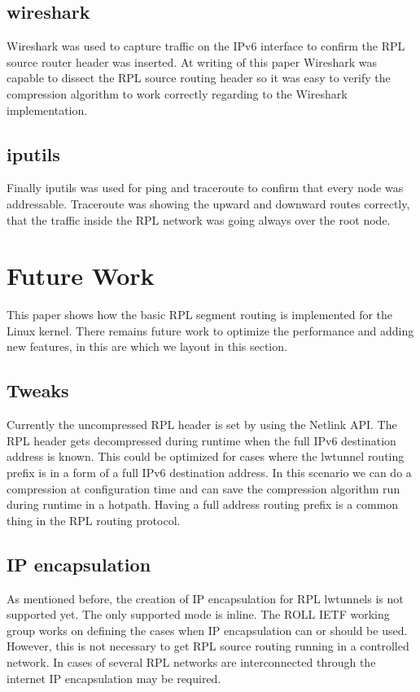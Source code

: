 \documentclass[letterpaper]{article}
\begin{document}
\subsection{wireshark}

Wireshark \cite{wireshark} was used to capture traffic on the IPv6 interface to confirm the RPL source router header was inserted.
At writing of this paper Wireshark was capable to dissect the RPL source routing header so it was easy to verify the compression algorithm to work correctly regarding to the Wireshark implementation.

\subsection{iputils}

Finally iputils \cite{iputils} was used for ping and traceroute to confirm that every node was addressable.
Traceroute was showing the upward and downward routes correctly, that the traffic inside the RPL network was going always over the root node.

\section{Future Work}

This paper shows how the basic RPL segment routing is implemented for the Linux kernel.
There remains future work to optimize the performance and adding new features, in this are which we layout in this section.

\subsection{Tweaks}

Currently the uncompressed RPL header is set by using the Netlink API.
The RPL header gets decompressed during runtime when the full IPv6 destination address is known.
This could be optimized for cases where the lwtunnel routing prefix is in a form
of a full IPv6 destination address. In this scenario we can do a compression at
configuration time and can save the compression algorithm run during runtime in
a hotpath. Having a full address routing prefix is a common thing in the RPL routing protocol.

\subsection{IP encapsulation}

As mentioned before, the creation of IP encapsulation for RPL lwtunnels is not supported yet.
The only supported mode is inline. The ROLL IETF working group works on defining
the cases when IP encapsulation \cite{I-D.ietf-roll-useofrplinfo} can or should
be used.
However, this is not necessary to get RPL source routing running in a controlled network.
In cases of several RPL networks are interconnected through the internet IP encapsulation may be required.
\end{document}

